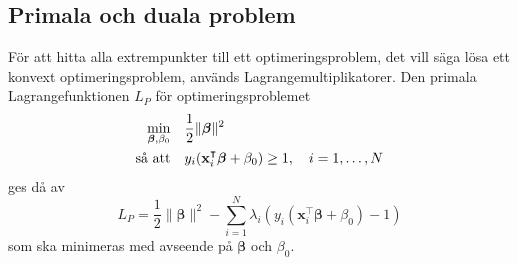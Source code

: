 \documentclass[a4paper, 12pt]{report}
\theoremstyle{definition}
\theoremstyle{remark}
\newcommand{\bfbeta}{{\boldsymbol{\beta}}}
\begin{document}
\subsection{Primala och duala problem}

För att hitta alla extrempunkter till ett optimeringsproblem, det vill säga lösa ett konvext optimeringsproblem, används Lagrangemultiplikatorer.
Den primala Lagrangefunktionen $L_P$ för optimeringsproblemet
\begin{equation*}
\begin{aligned}
\operatornamewithlimits{min}_{\bfbeta,\beta_0} & & &\frac{1}{2}\|\bfbeta\|^2\\
\text{så att} & & &y_i(\mathbf{x}_i^\intercal\bfbeta+\beta_0)\geq 1,\quad i=1,\dots,N
\end{aligned}
\end{equation*}
ges då av
\begin{equation}\label{eq:primallagrange}
L_P=\frac{1}{2}\|\bfbeta\|^2 - \sum_{i=1}^{N} \lambda_i\left(y_i \left(\mathbf{x}_i^\intercal\bfbeta + \beta_0\right)-1\right)
\end{equation}
som ska minimeras med avseende på $\bfbeta$ och $\beta_0$.
\end{document}
